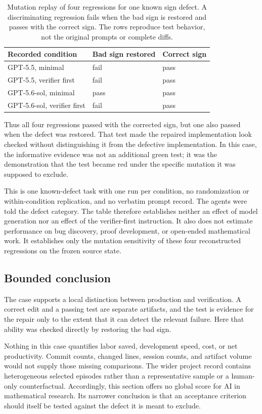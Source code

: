 \begin{table}[htbp]
  \centering
  \caption{Mutation replay of four regressions for one known sign defect.  A
  discriminating regression fails when the bad sign is restored and passes
  with the correct sign.  The rows reproduce test behavior, not the original
  prompts or complete diffs.}
  \label{tab:ai-sign-replay}
  \begin{tabular}{@{}lll@{}}
    \toprule
    Recorded condition & Bad sign restored & Correct sign \\
    \midrule
    GPT-5.5, minimal        & fail & pass \\
    GPT-5.5, verifier first & fail & pass \\
    GPT-5.6-sol, minimal        & pass & pass \\
    GPT-5.6-sol, verifier first & fail & pass \\
    \bottomrule
  \end{tabular}
\end{table}

Thus all four regressions passed with the corrected sign, but one also passed
when the defect was restored.  That test made the repaired implementation look
checked without distinguishing it from the defective implementation.  In this
case, the informative evidence was not an additional green test; it was the
demonstration that the test became red under the specific mutation it was
supposed to exclude.

This is one known-defect task with one run per condition, no randomization or
within-condition replication, and no verbatim prompt record.  The agents were
told the defect category.  The table therefore establishes neither an effect
of model generation nor an effect of the verifier-first instruction.  It also
does not estimate performance on bug discovery, proof development, or
open-ended mathematical work.  It establishes only the mutation sensitivity
of these four reconstructed regressions on the frozen source state.

\subsection{Bounded conclusion}

The case supports a local distinction between production and verification.  A
correct edit and a passing test are separate artifacts, and the test is
evidence for the repair only to the extent that it can detect the relevant
failure.  Here that ability was checked directly by restoring the bad sign.

Nothing in this case quantifies labor saved, development speed, cost, or net
productivity.  Commit counts, changed lines, session counts, and artifact
volume would not supply those missing comparisons.  The wider project record
contains heterogeneous selected episodes rather than a representative sample
or a human-only counterfactual.  Accordingly, this section offers no global
score for AI in mathematical research.  Its narrower conclusion is that an
acceptance criterion should itself be tested against the defect it is meant to
exclude.
